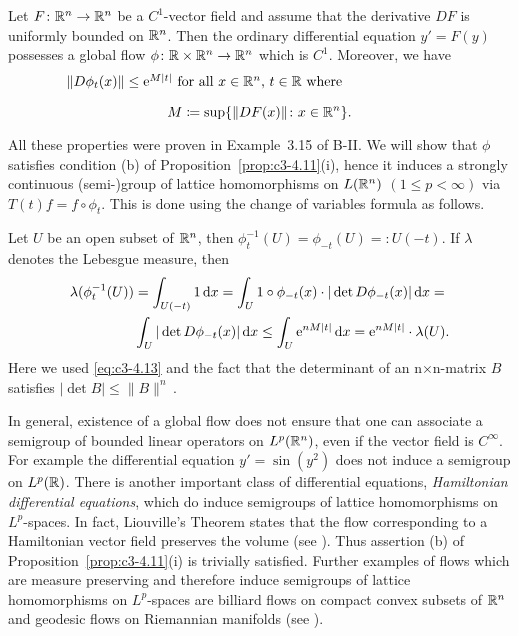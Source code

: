 \begin{example}\label{ex:c3-4.12}
Let $F \colon \mathbb{R} ^n \to \mathbb{R} ^n$ be a $C^1$-vector field and assume that
the derivative $DF$ is uniformly bounded on $\mathbb{R} ^n$. Then the ordinary
differential equation $y' = F(y)$ possesses a global flow
$\phi \colon \mathbb{R}  \times \mathbb{R} ^n \to \mathbb{R} ^n$ which is $C^1$. Moreover, we have
\begin{equation}\label{eq:c3-4.13}
\begin{minipage}{.8\textwidth} 
$\|D\phi_t(x)\| \leq \mathrm{e}^{M|t|}$  for all  $x \in \R ^n$, $t \in \R$  where   
%
\[
	M \coloneqq  \sup \{\|DF(x)\| \colon x \in \R ^n\}.
\]
% 
\end{minipage}
\end{equation}

All these properties were proven in Example~3.15 of B-II.
We will show that $\phi$ satisfies condition (b) of Proposition~\ref{prop:c3-4.11}(i),
hence it induces a strongly continuous (semi-)group of lattice homomorphisms
on $L(\mathbb{R} ^n)$ $(1 \leq p < \infty)$ via $T(t)f = f \circ \phi_t$.
This is done using the change of variables formula as follows.

Let $U$ be an open subset of $\mathbb{R} ^n$, then $\phi_t^{-1}(U) = \phi_{-t}(U) =\colon U(-t)$. 
If $\lambda$ denotes the Lebesgue measure, then
\begin{equation}\label{eq:c3-4.14}
	\begin{aligned}
		\lambda(\phi_t^{-1}(U)) &= \int_{U(-t)} 1 \mathop{}\!\mathrm{d}{x}  = \int_{U} 1 \circ \phi_{-t}(x) \cdot |\det D\phi_{-t}(x)| \mathop{}\!\mathrm{d}{x}  = \\
		&\int_{U} |\det D\phi_{-t}(x)| \mathop{}\!\mathrm{d}{x}  \leq \int_{U} \mathrm{e}^{nM|t|} \mathop{}\!\mathrm{d}{x}  = \mathrm{e}^{nM|t|} \cdot \lambda(U).
	\end{aligned}
\end{equation}
Here we used \eqref{eq:c3-4.13} and the fact that the determinant of an n$\times$n-matrix
$B$ satisfies $|\det B| \leq \|B\|^n$\,.
\end{example}

In general, existence of a global flow does not ensure that one can
associate a semigroup of bounded linear operators on $L^p(\mathbb{R} ^n)$, even if
the vector field is $C^{\infty}$. For example the differential equation
$y' = \sin(y^2)$ does not induce a semigroup on $L^p(\mathbb{R} )$.
There is another important class of differential equations, \emph{Hamiltonian differential equations}, which do induce semigroups of lattice homomorphisms on $L^p$-spaces. In fact, Liouville's Theorem states that the flow corresponding to a Hamiltonian vector field preserves the volume (see \citet[Section~3.3]{abraham:1978}). Thus assertion (b) of Proposition~\ref{prop:c3-4.11}(i) is trivially satisfied.
Further examples of flows which are measure preserving and therefore induce semigroups of lattice homomorphisms on $L^p$-spaces are billiard flows on compact convex subsets of $\mathbb{R} ^n$ and geodesic flows on Riemannian manifolds (see \citet{cornfeldetal:1982}).



